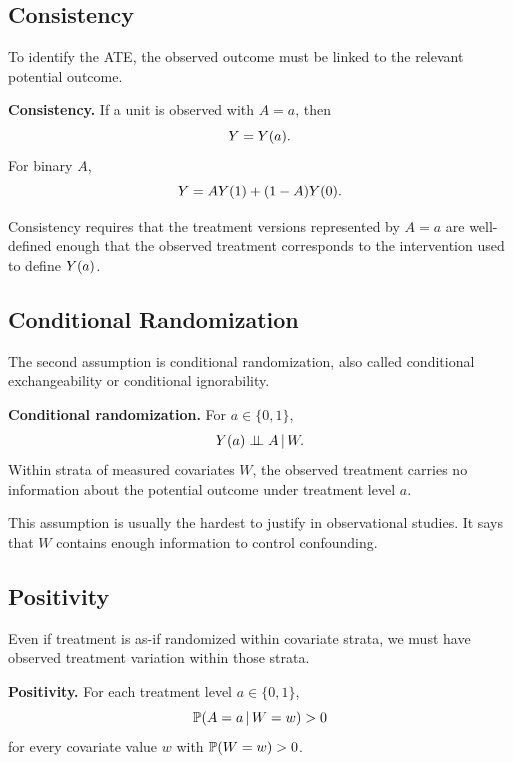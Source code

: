 \label{lec:3-5}

\subsection{Consistency}

To identify the ATE, the observed outcome must be linked to the relevant potential outcome.

\begin{assumptionbox}
\textbf{Consistency.} If a unit is observed with $A=a$, then
\[
Y=Y(a).
\]
For binary $A$,
\[
Y=AY(1)+(1-A)Y(0).
\]
\end{assumptionbox}

Consistency requires that the treatment versions represented by $A=a$ are well-defined enough that the observed treatment corresponds to the intervention used to define $Y(a)$.

\subsection{Conditional Randomization}

The second assumption is conditional randomization, also called conditional exchangeability or conditional ignorability.

\begin{assumptionbox}
\textbf{Conditional randomization.} For $a\in\{0,1\}$,
\[
Y(a)\perp\!\!\!\perp A\,\vert\, W.
\]
Within strata of measured covariates $W$, the observed treatment carries no information about the potential outcome under treatment level $a$.
\end{assumptionbox}

This assumption is usually the hardest to justify in observational studies. It says that $W$ contains enough information to control confounding.

\subsection{Positivity}

Even if treatment is as-if randomized within covariate strata, we must have observed treatment variation within those strata.

\begin{assumptionbox}
\textbf{Positivity.} For each treatment level $a\in\{0,1\}$,
\[
\mathbb{P}(A=a\,\vert\, W=w)>0
\]
for every covariate value $w$ with $\mathbb{P}(W=w)>0$.
\end{assumptionbox}

